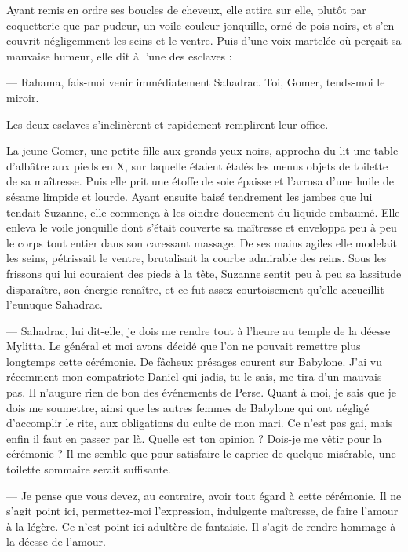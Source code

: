\documentclass[a4paper, 11pt, oneside, polutonikogreek, french]{article}
\begin{document}
\bigskip
\centerline{\EightStarTaper}
\centerline{\EightStarTaper\EightStarTaper}
\bigskip

Ayant remis en ordre ses boucles de cheveux, elle attira sur elle, plutôt par coquetterie que par pudeur, un voile couleur jonquille, orné de pois noirs, et s'en couvrit négligemment les seins et le ventre. Puis d'une voix martelée où perçait sa mauvaise humeur, elle dit à l'une des esclaves :

--- Rahama, fais-moi venir immédiatement Sahadrac. Toi, Gomer, tends-moi le miroir.

Les deux esclaves s'inclinèrent et rapidement remplirent leur office.

La jeune Gomer, une petite fille aux grands yeux noirs, approcha du lit une table d'albâtre aux pieds en X, sur laquelle étaient étalés les menus objets de toilette de sa maîtresse. Puis elle prit une étoffe de soie épaisse et l'arrosa d'une huile de sésame limpide et lourde. Ayant ensuite baisé tendrement les jambes que lui tendait Suzanne, elle commença à les oindre doucement du liquide embaumé. Elle enleva le voile jonquille dont s'était couverte sa maîtresse et enveloppa peu à peu le corps tout entier dans son caressant massage. De ses mains agiles elle modelait les seins, pétrissait le ventre, brutalisait la courbe admirable des reins. Sous les frissons qui lui couraient des pieds à la tête, Suzanne sentit peu à peu sa lassitude disparaître, son énergie renaître, et ce fut assez courtoisement qu'elle accueillit l'eunuque Sahadrac.

\bigskip
\centerline{\EightStarTaper}
\centerline{\EightStarTaper\EightStarTaper}
\bigskip

--- Sahadrac, lui dit-elle, je dois me rendre tout à l'heure au temple de la déesse Mylitta. Le général et moi avons décidé que l'on ne pouvait remettre plus longtemps cette cérémonie. De fâcheux présages courent sur Babylone. J'ai vu récemment mon compatriote Daniel qui jadis, tu le sais, me tira d'un mauvais pas. Il n'augure rien de bon des événements de Perse. Quant à moi, je sais que je dois me soumettre, ainsi que les autres femmes de Babylone qui ont négligé d'accomplir le rite, aux obligations du culte de mon mari. Ce n'est pas gai, mais enfin il faut en passer par là. Quelle est ton opinion ? Dois-je me vêtir pour la cérémonie ? Il me semble que pour satisfaire le caprice de quelque misérable, une toilette sommaire serait suffisante.

--- Je pense que vous devez, au contraire, avoir tout égard à cette cérémonie. Il ne s'agit point ici, permettez-moi l'expression, indulgente maîtresse, de faire l'amour à la légère. Ce n'est point ici adultère de fantaisie. Il s'agit de rendre hommage à la déesse de l'amour.
\end{document}
